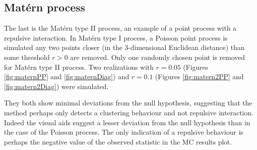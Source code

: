 \documentclass{article}
\begin{document}
\subsection{Mat\'{e}rn process}

The last is the Mat\'{e}rn type II process, an example of a point process with a repulsive interaction. In Mat\'{e}rn type I process, a Poisson point process is simulated any two points closer (in the 3-dimensional Euclidean distance) than some threshold $r>0$ are removed. Only one randomly chosen point is removed for Mat\'{e}rn type II process. Two realizations with $r=0.05$ (Figures  \ref{fig:maternPP} and \ref{fig:maternDiag}) and $r=0.1$ (Figures  \ref{fig:matern2PP} and \ref{fig:matern2Diag}) were simulated.

They both show minimal deviations from the null hypothesis, suggesting that the method perhaps only detects a clustering behaviour and not repulsive interaction. Indeed the visual aids suggest a lesser deviation from the null hypothesis than in the case of the Poisson process. The only indication of a repulsive behaviour is perhaps the negative value of the observed statistic in the MC results plot.
\end{document}
